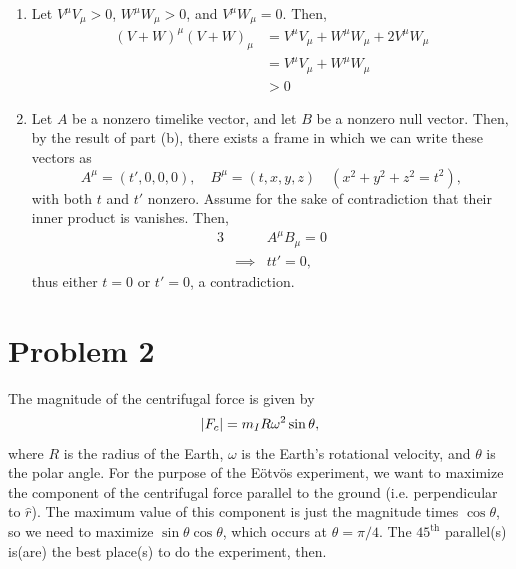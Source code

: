 \documentclass[12pt]{article}
\begin{document}
\begin{enumerate}[label=(\alph*)]
\begin{figure}
{
        }
        \caption{A spacetime diagram illustrating a timelike event which occurs at $x' = 0$.}
        \label{fig1}
    \end{figure}

    \item Let $V^\mu V_\mu > 0$, $W^\mu W_\mu > 0$, and $V^\mu W_\mu = 0$. Then,
    \begin{align*}
        (V+W)^\mu (V+W)_\mu &= V^\mu V_\mu + W^\mu W_\mu + 2V^\mu W_\mu \\
        &= V^\mu V_\mu + W^\mu W_\mu \\
        & > 0
    \end{align*}

    \item Let $A$ be a nonzero timelike vector, and let $B$ be a nonzero null vector. Then, by the result of part (b), there exists a frame in which we can write these vectors as
    \[ A^\mu = (t', 0, 0, 0), \quad B^\mu = (t, x, y, z) \quad (x^2 + y^2 + z^2 = t^2), \] with both $t$ and $t'$ nonzero. Assume for the sake of contradiction that their inner product is vanishes. Then,
    \begin{alignat*}{3}
        &          & A^\mu B_\mu = 0 \\
        &\implies  & tt' = 0,
    \end{alignat*}
    thus either $t=0$ or $t'=0$, a contradiction.
\end{enumerate}


\section*{Problem 2}
The magnitude of the centrifugal force is given by
\[ \abs{F_c} = m_I R \omega^2 \sin\theta, \]
where $R$ is the radius of the Earth, $\omega$ is the Earth's rotational velocity, and $\theta$ is the polar angle. For the purpose of the E{\"o}tv{\"o}s experiment, we want to maximize the component of the centrifugal force parallel to the ground (i.e. perpendicular to $\hat{r}$). The maximum value of this component is just the magnitude times $\cos\theta$, so we need to maximize $\sin\theta\cos\theta$, which occurs at $\boxed{\theta = \pi/4}$. The $45^\text{th}$ parallel(s) is(are) the best place(s) to do the experiment, then.
\end{document}
